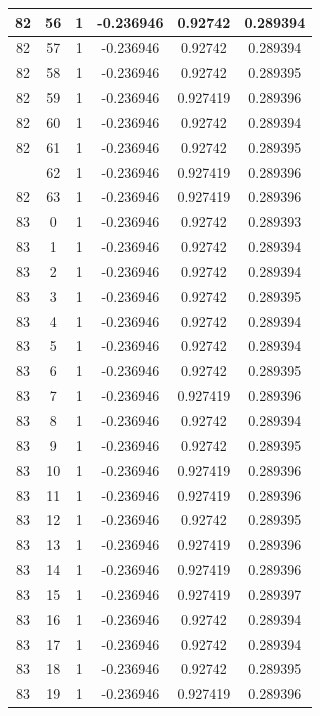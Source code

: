 \documentclass[12pt,a4paper]{article}
\numberwithin{equation}{section}
\numberwithin{figure}{section}
\numberwithin{table}{section}
\begin{document}
\begin{longtable}{|c|c|c|c|c|c|}
82 & 56 & 1 & -0.236946 & 0.92742 & 0.289394 \\ \hline
82 & 57 & 1 & -0.236946 & 0.92742 & 0.289394 \\ \hline
82 & 58 & 1 & -0.236946 & 0.92742 & 0.289395 \\ \hline
82 & 59 & 1 & -0.236946 & 0.927419 & 0.289396 \\ \hline
82 & 60 & 1 & -0.236946 & 0.92742 & 0.289394 \\ \hline
82 & 61 & 1 & -0.236946 & 0.92742 & 0.289395 \\ \hline
\pagebreak
82 & 62 & 1 & -0.236946 & 0.927419 & 0.289396 \\ \hline
82 & 63 & 1 & -0.236946 & 0.927419 & 0.289396 \\ \hline
83 & 0 & 1 & -0.236946 & 0.92742 & 0.289393 \\ \hline
83 & 1 & 1 & -0.236946 & 0.92742 & 0.289394 \\ \hline
83 & 2 & 1 & -0.236946 & 0.92742 & 0.289394 \\ \hline
83 & 3 & 1 & -0.236946 & 0.92742 & 0.289395 \\ \hline
83 & 4 & 1 & -0.236946 & 0.92742 & 0.289394 \\ \hline
83 & 5 & 1 & -0.236946 & 0.92742 & 0.289394 \\ \hline
83 & 6 & 1 & -0.236946 & 0.92742 & 0.289395 \\ \hline
83 & 7 & 1 & -0.236946 & 0.927419 & 0.289396 \\ \hline
83 & 8 & 1 & -0.236946 & 0.92742 & 0.289394 \\ \hline
83 & 9 & 1 & -0.236946 & 0.92742 & 0.289395 \\ \hline
83 & 10 & 1 & -0.236946 & 0.927419 & 0.289396 \\ \hline
83 & 11 & 1 & -0.236946 & 0.927419 & 0.289396 \\ \hline
83 & 12 & 1 & -0.236946 & 0.92742 & 0.289395 \\ \hline
83 & 13 & 1 & -0.236946 & 0.927419 & 0.289396 \\ \hline
83 & 14 & 1 & -0.236946 & 0.927419 & 0.289396 \\ \hline
83 & 15 & 1 & -0.236946 & 0.927419 & 0.289397 \\ \hline
83 & 16 & 1 & -0.236946 & 0.92742 & 0.289394 \\ \hline
83 & 17 & 1 & -0.236946 & 0.92742 & 0.289394 \\ \hline
83 & 18 & 1 & -0.236946 & 0.92742 & 0.289395 \\ \hline
83 & 19 & 1 & -0.236946 & 0.927419 & 0.289396 \\ \hline

\end{longtable}
\end{document}
